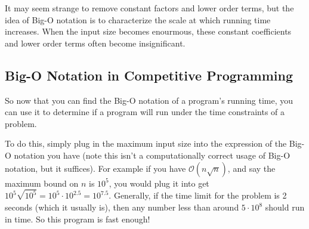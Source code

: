 \documentclass{article}
\begin{document}
It may seem strange to remove constant factors and lower order terms, but the idea of Big-O notation is to characterize the scale at which running time increases. When the input size becomes enourmous, these constant coefficients and lower order terms often become insignificant.

\subsection{Big-O Notation in Competitive Programming}
So now that you can find the Big-O notation of a program's running time, you can use it to determine if a program will run under the time constraints of a problem.

To do this, simply plug in the maximum input size into the expression of the Big-O notation you have (note this isn't a computationally correct usage of Big-O notation, but it suffices). For example if you have $\mathcal{O}(n\sqrt{n})$, and say the maximum bound on $n$ is $10^5$, you would plug it into get $10^5\sqrt{10^5} = 10^5\cdot 10^{2.5} = 10^{7.5}$. Generally, if the time limit for the problem is 2 seconds (which it usually is), then any number less than around $5\cdot 10^8$ should run in time. So this program is fast enough!
\end{document}
